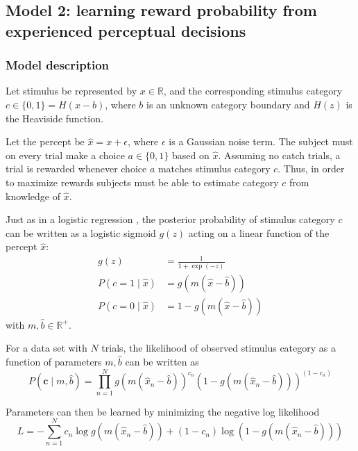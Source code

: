 \subsection{Model 2: learning reward probability from experienced perceptual decisions}

\subsubsection{Model description}

Let stimulus be represented by $x \in \mathbb{R}$, and the corresponding stimulus category $c \in \{0,1\} = H(x-b)$, where $b$ is an unknown category boundary and $H(z)$ is the Heaviside function.

Let the percept be $\hat{x} = x + \epsilon$, where $\epsilon$ is a Gaussian noise term.
The subject must on every trial make a choice $a \in \{0,1\}$ based on $\hat{x}$.
Assuming no catch trials, a trial is rewarded whenever choice $a$ matches stimulus category $c$.
Thus, in order to maximize rewards subjects must be able to estimate category $c$ from knowledge of $\hat{x}$.

Just as in a logistic regression \cite[Section 4.3.2]{bishop2006pattern}, the posterior probability of stimulus category $c$ can be written as a logistic sigmoid $g(z)$ acting on a linear function of the percept $\hat{x}$:
\begin{align}
g(z) &= \frac{1}{1+\exp(-z)} \\
P(c = 1 \mid \hat{x}) &= g(m(\hat{x}-\hat{b})) \label{eq:Pcgperc} \\
P(c = 0 \mid \hat{x}) &= 1 - g(m(\hat{x}-\hat{b}))
\end{align}
with $m, \hat{b} \in \mathbb{R}^+$.

For a data set with $N$ trials, the likelihood of observed stimulus category as a function of parameters  $m, \hat{b}$ can be written as 
\begin{equation}
    P(\mathbf{c} \mid m, \hat{b}) = \prod_{n=1}^N g(m(\hat{x}_n-\hat{b}))^{c_n} \left(1-g(m(\hat{x}_n-\hat{b}))\right)^{(1-c_n)}
\end{equation}

Parameters can then be learned by minimizing the negative log likelihood
\begin{equation}
    L = - \sum_{n=1}^N
    {c_n} \log g(m(\hat{x}_n-\hat{b})) + 
    {(1-c_n)} \log \left(1-g(m(\hat{x}_n-\hat{b}))\right)
\end{equation}

